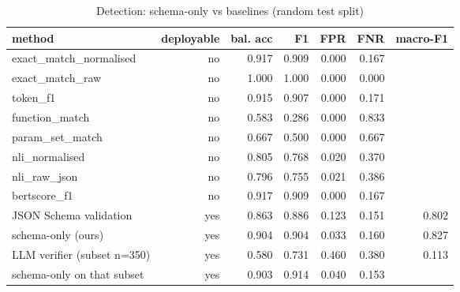 \begin{table}[t]
\centering
\caption{Detection: schema-only vs baselines (random test split)}
\label{tab:baselines_detection_random}
\begin{tabular}{lrrrrrr}
\hline
method & deployable & bal. acc & F1 & FPR & FNR & macro-F1 \\
\hline
exact\_match\_normalised & no & 0.917 & 0.909 & 0.000 & 0.167 &  \\
exact\_match\_raw & no & 1.000 & 1.000 & 0.000 & 0.000 &  \\
token\_f1 & no & 0.915 & 0.907 & 0.000 & 0.171 &  \\
function\_match & no & 0.583 & 0.286 & 0.000 & 0.833 &  \\
param\_set\_match & no & 0.667 & 0.500 & 0.000 & 0.667 &  \\
nli\_normalised & no & 0.805 & 0.768 & 0.020 & 0.370 &  \\
nli\_raw\_json & no & 0.796 & 0.755 & 0.021 & 0.386 &  \\
bertscore\_f1 & no & 0.917 & 0.909 & 0.000 & 0.167 &  \\
JSON Schema validation & yes & 0.863 & 0.886 & 0.123 & 0.151 & 0.802 \\
schema-only (ours) & yes & 0.904 & 0.904 & 0.033 & 0.160 & 0.827 \\
LLM verifier (subset n=350) & yes & 0.580 & 0.731 & 0.460 & 0.380 & 0.113 \\
schema-only on that subset & yes & 0.903 & 0.914 & 0.040 & 0.153 &  \\
\hline
\end{tabular}
\end{table}
